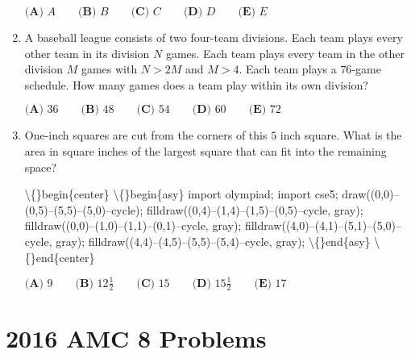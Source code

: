 \documentclass{article}
\begin{document}
\begin{enumerate}[label=\arabic*., itemsep=0.5em]
\(
\textbf{(A) } A \qquad
\textbf{(B) } B \qquad
\textbf{(C) } C \qquad
\textbf{(D) } D \qquad
\textbf{(E) } E
\)\par \vspace{0.5em}\item A baseball league consists of two four-team divisions. Each team plays every other team in its division \(N\) games. Each team plays every team in the other division \(M\) games with \(N>2M\) and \(M>4\). Each team plays a \(76\)-game schedule. How many games does a team play within its own division?

\(\textbf{(A) } 36 \qquad \textbf{(B) } 48 \qquad \textbf{(C) } 54 \qquad \textbf{(D) } 60 \qquad \textbf{(E) } 72\)\par \vspace{0.5em}\item One-inch squares are cut from the corners of this \(5\) inch square. What is the area in square inches of the largest square that can fit into the remaining space?


\textbackslash\{\}begin\{center\}
\textbackslash\{\}begin\{asy\}
import olympiad;
import cse5;
draw((0,0)--(0,5)--(5,5)--(5,0)--cycle);
filldraw((0,4)--(1,4)--(1,5)--(0,5)--cycle, gray);
filldraw((0,0)--(1,0)--(1,1)--(0,1)--cycle, gray);
filldraw((4,0)--(4,1)--(5,1)--(5,0)--cycle, gray);
filldraw((4,4)--(4,5)--(5,5)--(5,4)--cycle, gray);
\textbackslash\{\}end\{asy\}
\textbackslash\{\}end\{center\}


\( \textbf{(A) } 9\qquad \textbf{(B) } 12\frac{1}{2}\qquad \textbf{(C) } 15\qquad \textbf{(D) } 15\frac{1}{2}\qquad \textbf{(E) } 17\)\par \vspace{0.5em}\end{enumerate}\newpage\section*{2016 AMC 8 Problems}
\end{document}
